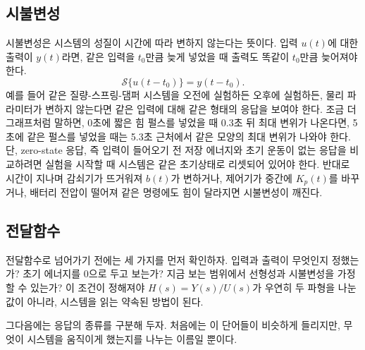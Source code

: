 \subsection{시불변성}

시불변성은 시스템의 성질이 시간에 따라 변하지 않는다는 뜻이다.
입력 $u(t)$에 대한 출력이 $y(t)$라면, 같은 입력을 $t_0$만큼 늦게 넣었을 때 출력도 똑같이 $t_0$만큼 늦어져야 한다.
\begin{equation}
  \mathcal{S}\{u(t-t_0)\} = y(t-t_0).
\end{equation}
예를 들어 같은 질량-스프링-댐퍼 시스템을 오전에 실험하든 오후에 실험하든, 물리 파라미터가 변하지 않는다면 같은 입력에 대해 같은 형태의 응답을 보여야 한다.
조금 더 그래프처럼 말하면, 0초에 짧은 힘 펄스를 넣었을 때 0.3초 뒤 최대 변위가 나온다면, 5초에 같은 펄스를 넣었을 때는 5.3초 근처에서 같은 모양의 최대 변위가 나와야 한다.
단, zero-state 응답, 즉 입력이 들어오기 전 저장 에너지와 초기 운동이 없는 응답을 비교하려면 실험을 시작할 때 시스템은 같은 초기상태로 리셋되어 있어야 한다.
반대로 시간이 지나며 감쇠기가 뜨거워져 $b(t)$가 변하거나, 제어기가 중간에 $K_p(t)$를 바꾸거나, 배터리 전압이 떨어져 같은 명령에도 힘이 달라지면 시불변성이 깨진다.

\subsection{전달함수}

전달함수로 넘어가기 전에는 세 가지를 먼저 확인하자.
입력과 출력이 무엇인지 정했는가?
초기 에너지를 0으로 두고 보는가?
지금 보는 범위에서 선형성과 시불변성을 가정할 수 있는가?
이 조건이 정해져야 $H(s)=Y(s)/U(s)$가 우연히 두 파형을 나눈 값이 아니라, 시스템을 읽는 약속된 방법이 된다.

그다음에는 응답의 종류를 구분해 두자.
처음에는 이 단어들이 비슷하게 들리지만, 무엇이 시스템을 움직이게 했는지를 나누는 이름일 뿐이다.

